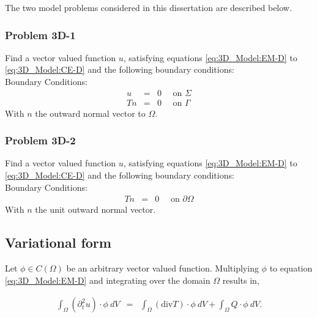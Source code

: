 \documentclass[../../main.tex]{subfiles}
\begin{document}
The two model problems considered in this dissertation are described below.

\subsubsection{Problem 3D-1}\label{sssec:3D_Model:Problem3D1}
Find a vector valued function $u$, satisfying equations \eqref{eq:3D_Model:EM-D} to \eqref{eq:3D_Model:CE-D} and the following boundary conditions:\\

Boundary Conditions:
\begin{eqnarray*}
	u & = & 0 \quad \textrm{ on } \Sigma\\
	Tn & = & 0 \quad \textrm{ on } \Gamma
\end{eqnarray*} With $n$ the outward normal vector to $\Omega$.

\subsubsection{Problem 3D-2}\label{sssec:3D_Model:Problem3D2}
Find a vector valued function $u$, satisfying equations \eqref{eq:3D_Model:EM-D} to \eqref{eq:3D_Model:CE-D} and the following boundary conditions:\\

Boundary Conditions:
\begin{eqnarray*}
	Tn & = & 0 \quad \textrm{ on } \partial\Omega
\end{eqnarray*} With $n$ the unit outward normal vector.




\subsection{Variational form}\label{ssec:3D_Model:VariationalForm}
Let $\phi \in C({\Omega})$ be an arbitrary vector valued function. Multiplying $\phi$ to equation \eqref{eq:3D_Model:EM-D} and integrating over the domain $\Omega$ results in,

\begin{eqnarray*}
	\int_{\Omega} (\partial_t^2 u)\cdot \phi \ dV & = & \int_{\Omega} (\textrm{div} T)\cdot \phi \ dV + \int_{\Omega} Q \cdot \phi \ dV.
\end{eqnarray*}
\end{document}
